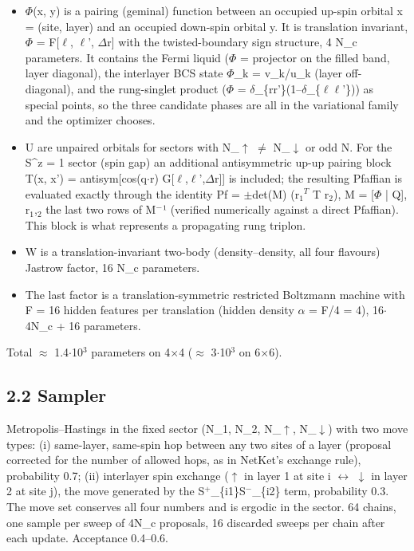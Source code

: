 \documentclass[10pt]{article}
\begin{document}
\begin{itemize}
\item $\Phi$(x, y) is a pairing (geminal) function between an occupied up-spin orbital x = (site, layer) and an occupied
down-spin orbital y. It is translation invariant, $\Phi$ = F[$\ell$, $\ell$', $\Delta$r] with the twisted-boundary sign structure,
4 N\_c parameters. It contains the Fermi liquid ($\Phi$ = projector on the filled band, layer diagonal), the interlayer
BCS state $\Phi$\_k = v\_k/u\_k (layer off-diagonal), and the rung-singlet product ($\Phi$ = $\delta$\_\{rr'\}(1--$\delta$\_\{$\ell$$\ell$'\})) as
special points, so the three candidate phases are all in the variational family and the optimizer chooses.
\item U are unpaired orbitals for sectors with N\_$\uparrow$ $\ne$ N\_$\downarrow$ or odd N. For the S\^{}z = 1 sector (spin gap) an additional
antisymmetric up-up pairing block T(x, x') = antisym[cos(q$\cdot$r) G[$\ell$,$\ell$',$\Delta$r]] is included; the resulting Pfaffian is
evaluated exactly through the identity Pf = $\pm$det(M) (r$_1$$^T$ T r$_2$), M = [$\Phi$ | Q], r$_1$,$_2$ the last two rows of M$^-$¹
(verified numerically against a direct Pfaffian). This block is what represents a propagating rung triplon.
\item W is a translation-invariant two-body (density--density, all four flavours) Jastrow factor, 16 N\_c parameters.
\item The last factor is a translation-symmetric restricted Boltzmann machine with F = 16 hidden features per
translation (hidden density $\alpha$ = F/4 = 4), 16$\cdot$4N\_c + 16 parameters.
\end{itemize}
Total $\approx$ 1.4$\cdot$10$^3$ parameters on 4$\times$4 ($\approx$ 3$\cdot$10$^3$ on 6$\times$6).

\subsection*{2.2 Sampler}

Metropolis--Hastings in the fixed sector (N\_1, N\_2, N\_$\uparrow$, N\_$\downarrow$) with two move types: (i) same-layer, same-spin hop between any two sites of a layer (proposal corrected for the number of allowed hops, as in NetKet's exchange rule), probability 0.7; (ii) interlayer spin exchange ($\uparrow$ in layer 1 at site i $\leftrightarrow$ $\downarrow$ in layer 2 at site j), the move generated by the S$^+$\_\{i1\}S$^-$\_\{i2\} term, probability 0.3. The move set conserves all four numbers and is ergodic in the sector. 64 chains, one sample per sweep of 4N\_c proposals, 16 discarded sweeps per chain after each update. Acceptance 0.4--0.6.
\end{document}
